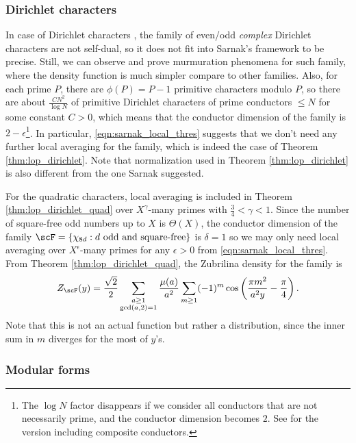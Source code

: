 \subsubsection{Dirichlet characters}

In case of Dirichlet characters \cite{lee2025murmurations}, the family of even/odd \emph{complex} Dirichlet characters are not self-dual, so it does not fit into Sarnak's framework to be precise.
Still, we can observe and prove murmuration phenomena for such family, where the density function is much simpler compare to other families.
Also, for each prime $P$, there are $\phi(P) = P-1$ primitive characters modulo $P$, so there are about $\frac{CN^2}{\log N}$ of primitive Dirichlet characters of prime conductors $\le N$ for some constant $C > 0$, which means that the conductor dimension of the family is $2-\epsilon$\footnote{The $\log N$ factor disappears if we consider all conductors that are not necessarily prime, and the conductor dimension becomes $2$. See \cite[Section 6]{lee2025murmurations} for the version including composite conductors.}.
In particular, \eqref{eqn:sarnak_local_thres} suggests that we don't need any further local averaging for the family, which is indeed the case of Theorem \ref{thm:lop_dirichlet}.
Note that normalization used in Theorem \ref{thm:lop_dirichlet} is also different from the one Sarnak suggested.

For the quadratic characters, local averaging is included in Theorem \ref{thm:lop_dirichlet_quad} over $X^{\gamma}$-many primes with $\frac{3}{4} < \gamma < 1$.
Since the number of square-free odd numbers up to $X$ is $\Theta(X)$, the conductor dimension of the family $\scF = \{\chi_{8d} : d\text{ odd and square-free}\}$ is $\delta = 1$ so we may only need local averaging over $X^{\epsilon}$-many primes for any $\epsilon > 0$ from \eqref{eqn:sarnak_local_thres}.
From Theorem \ref{thm:lop_dirichlet_quad}, the Zubrilina density for the family is
\begin{equation}
    Z_{\scF}(y) = \frac{\sqrt{2}}{2} \sum_{\substack{a \ge 1 \\ \gcd(a, 2) = 1}} \frac{\mu(a)}{a^2} \sum_{m \ge 1} (-1)^m \cos\left(\frac{\pi m^2}{a^2 y} - \frac{\pi}{4}\right).
\end{equation}
Note that this is not an actual function but rather a distribution, since the inner sum in $m$ diverges for the most of $y$'s.

\subsubsection{Modular forms}

